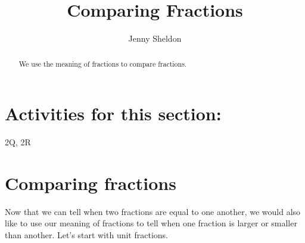 \documentclass{ximera}
\title{Comparing Fractions}
\author{Jenny Sheldon}
\begin{document}
\begin{abstract}
We use the meaning of fractions to compare fractions.
\end{abstract}
\maketitle

\section{Activities for this section:} 2Q, 2R


\section{Comparing fractions}

Now that we can tell when two fractions are equal to one another, we would also like to use our meaning of fractions to tell when one fraction is larger or smaller than another. Let's start with unit fractions.
\end{document}
